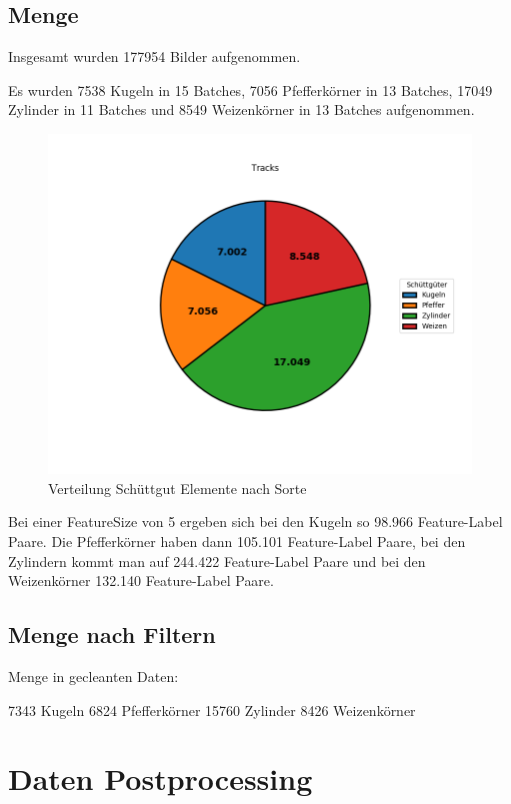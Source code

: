 \subsection{Menge}

Insgesamt wurden 177954 Bilder aufgenommen.

Es wurden 
7538 Kugeln in 15 Batches,
7056 Pfefferkörner in 13 Batches,
17049 Zylinder in 11 Batches
und 8549 Weizenkörner in 13 Batches aufgenommen.

\begin{figure}
    \centering
    \includegraphics[width=\textwidth]{img/scaledPieChart-trimmed}
    \caption{Verteilung Schüttgut Elemente nach Sorte}
    \label{piechartSchuettgut}
\end{figure}

Bei einer FeatureSize von 5 ergeben sich bei den Kugeln so 98.966 Feature-Label Paare.
Die Pfefferkörner haben dann 105.101 Feature-Label Paare,
bei den Zylindern kommt man auf 244.422 Feature-Label Paare
und bei den Weizenkörner 132.140 Feature-Label Paare.



\subsection{Menge nach Filtern}
Menge in gecleanten Daten:

7343 Kugeln
6824 Pfefferkörner
15760 Zylinder
8426 Weizenkörner


\section{Daten Postprocessing}

